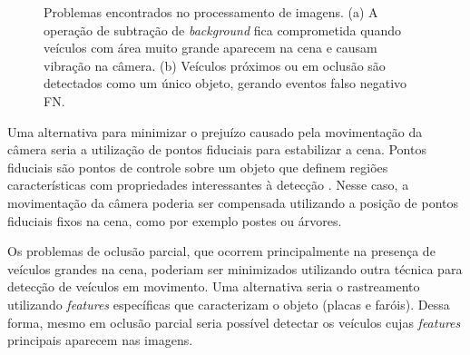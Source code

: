 \begin{figure}[ht]
\begin{center}
\begin{subfigure}[b]{.49\textwidth}
\begin{center}
      \end{center}
      \caption{}
      \label{fig:problema_veiculo_junto}
    \end{subfigure}
  \end{center}
  \caption{Problemas encontrados no processamento de imagens. (a) A operação de subtração de \textit{background} fica comprometida quando veículos com área muito grande aparecem na cena e causam vibração na câmera. (b) Veículos próximos ou em oclusão são detectados como um único objeto, gerando eventos falso negativo FN.}
  \label{fig:problemas}
\end{figure}

Uma alternativa para minimizar o prejuízo causado pela movimentação da câmera seria a utilização de pontos fiduciais para estabilizar a cena. Pontos fiduciais são pontos de controle sobre um objeto que definem regiões características com propriedades interessantes à detecção \citep{2012fiduciais}. Nesse caso, a movimentação da câmera poderia ser compensada utilizando a posição de pontos fiduciais fixos na cena, como por exemplo postes ou árvores.

Os problemas de oclusão parcial, que ocorrem principalmente na presença de veículos grandes na cena, poderiam ser minimizados utilizando outra técnica para detecção de veículos em movimento. Uma alternativa seria o rastreamento utilizando \textit{features} específicas que caracterizam o objeto (placas e faróis). Dessa forma, mesmo em oclusão parcial seria possível detectar os veículos cujas \textit{features} principais aparecem nas imagens. 





